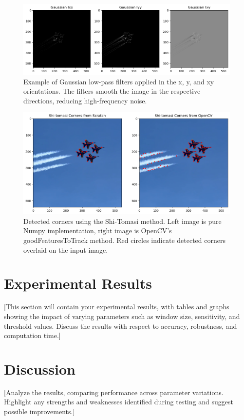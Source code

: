 \documentclass[11pt, conference, letterpaper]{IEEEtran}
\begin{document}
\begin{figure}[h]
    \centering
    \includegraphics[width=\linewidth]{images/gaussian_low_pass_filters.png}
    \caption{Example of Gaussian low-pass filters applied in the x, y, and xy orientations. The filters smooth the image in the respective directions, reducing high-frequency noise.}
    \label{fig:gaussian_lpf}
\end{figure}

\begin{figure}[h]
    \centering
    \includegraphics[width=\linewidth]{images/shi_tomasi_corners.png}
    \caption{Detected corners using the Shi-Tomasi method. Left image is pure Numpy implementation, right image is OpenCV's goodFeaturesToTrack method. Red circles indicate detected corners overlaid on the input image.}
    \label{fig:shi_tomasi_results}
\end{figure}


\section{Experimental Results}
[This section will contain your experimental results, with tables and graphs showing the impact of varying parameters such as window size, sensitivity, and threshold values. Discuss the results with respect to accuracy, robustness, and computation time.]

\section{Discussion}
[Analyze the results, comparing performance across parameter variations. Highlight any strengths and weaknesses identified during testing and suggest possible improvements.]
\end{document}
